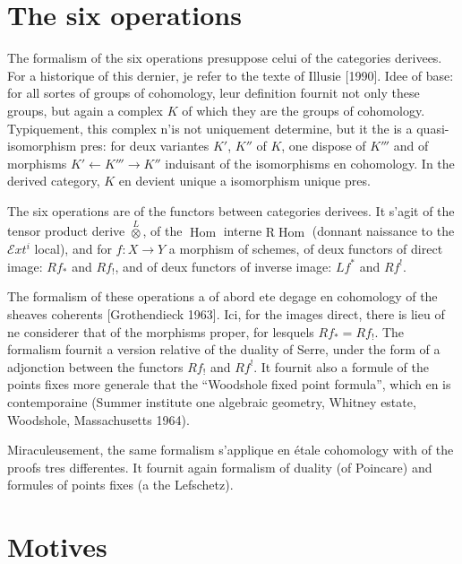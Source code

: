 \documentclass[11pt,a4paper]{article}
\theoremstyle{plain}
\theoremstyle{definition}
\DeclareMathOperator{\Hom}{Hom}
\begin{document}
\section{The six operations}

The formalism of the six operations presuppose celui of the categories derivees. For a historique of this dernier, je refer to the texte of Illusie [1990]. Idee of base: for all sortes of groups of cohomology, leur definition fournit not only these groups, but again a complex $K$ of which they are the groups of cohomology. Typiquement, this complex n'is not uniquement determine, but it the is a quasi-isomorphism pres: for deux variantes $K'$, $K''$ of $K$, one dispose of $K'''$ and of morphisms $K' \leftarrow K''' \rightarrow K''$ induisant of the isomorphisms en cohomology. In the derived category, $K$ en devient unique a isomorphism unique pres.

The six operations are of the functors between categories derivees. It s'agit of the tensor product derive $\overset{L}{\otimes}$, of the $\Hom$ interne $\mathrm{R}\!\Hom$ (donnant naissance to the $\mathcal{E}\!\mathit{xt}^i$ local), and for $f \colon X \to Y$ a morphism of schemes, of deux functors of direct image: $Rf_*$ and $Rf_!$, and of deux functors of inverse image: $Lf^*$ and $Rf^!$.

The formalism of these operations a of abord ete degage en cohomology of the sheaves coherents [Grothendieck 1963]. Ici, for the images direct, there is lieu of ne considerer that of the morphisms proper, for lesquels $Rf_* = Rf_!$. The formalism fournit a version relative of the duality of Serre, under the form of a adjonction between the functors $Rf_!$ and $Rf^!$. It fournit also a formule of the points fixes more generale that the ``Woodshole fixed point formula'', which en is contemporaine (Summer institute one algebraic geometry, Whitney estate, Woodshole, Massachusetts 1964).

Miraculeusement, the same formalism s'applique en étale cohomology with of the proofs tres differentes. It fournit again formalism of duality (of Poincare) and formules of points fixes (a the Lefschetz).

\section{Motives}
\end{document}
